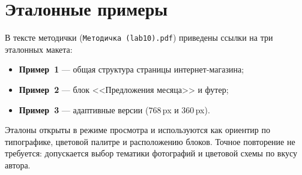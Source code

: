\section{Эталонные примеры}

В тексте методички (\texttt{Методичка~(lab10).pdf}) приведены ссылки на
три эталонных макета:
\begin{itemize}
  \item \textbf{Пример~1} --- общая структура страницы интернет-магазина;
  \item \textbf{Пример~2} --- блок <<Предложения месяца>> и футер;
  \item \textbf{Пример~3} --- адаптивные версии (\(768\,\)px и
        \(360\,\)px).
\end{itemize}
Эталоны открыты в режиме просмотра и используются как ориентир
по типографике, цветовой палитре и расположению блоков. Точное
повторение не требуется: допускается выбор тематики фотографий и
цветовой схемы по вкусу автора.

\endinput

